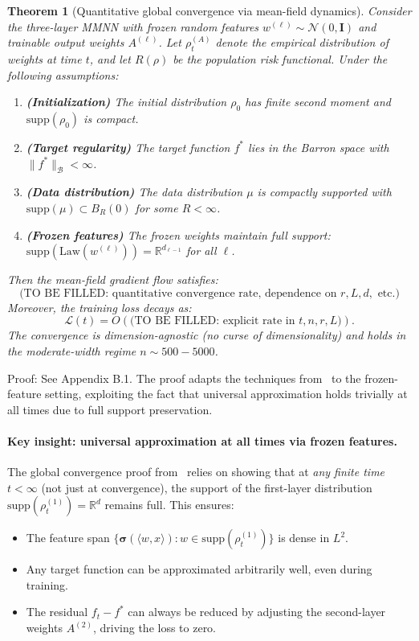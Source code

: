 \documentclass{article}
\DeclareRobustCommand{\ReLU}{\mathrel{\boldsymbol{\sigma}}}
\newtheorem{theorem}{Theorem}
\begin{document}
\begin{theorem}[Quantitative global convergence via mean-field dynamics]
\label{thm:quantitative_mf_convergence}
Consider the three-layer MMNN with frozen random features \( w^{(\ell)} \sim \mathcal{N}(0, \mathbf{I}) \) and trainable output weights \( A^{(\ell)} \). Let \( \rho_t^{(A)} \) denote the empirical distribution of weights at time \( t \), and let \( R(\rho) \) be the population risk functional. Under the following assumptions:
\begin{enumerate}
    \item \textbf{(Initialization)} The initial distribution \( \rho_0 \) has finite second moment and \( \text{supp}(\rho_0) \) is compact.
    \item \textbf{(Target regularity)} The target function \( f^* \) lies in the Barron space with \( \|f^*\|_{\mathcal{B}} < \infty \).
    \item \textbf{(Data distribution)} The data distribution \( \mu \) is compactly supported with \( \text{supp}(\mu) \subset B_R(0) \) for some \( R < \infty \).
    \item \textbf{(Frozen features)} The frozen weights maintain full support: \( \text{supp}(\text{Law}(w^{(\ell)})) = \mathbb{R}^{d_{\ell-1}} \) for all \( \ell \).
\end{enumerate}
Then the mean-field gradient flow satisfies:
\[
\text{(TO BE FILLED: quantitative convergence rate, dependence on } r, L, d, \text{ etc.)}
\]
Moreover, the training loss decays as:
\[
\mathcal{L}(t) = O\!\left(\text{(TO BE FILLED: explicit rate in } t, n, r, L\text{)}\right).
\]
The convergence is dimension-agnostic (no curse of dimensionality) and holds in the moderate-width regime \( n \sim 500{-}5000 \).
\end{theorem}

Proof: See Appendix B.1. The proof adapts the techniques from~\cite{globalconvergencesthreelayer} to the frozen-feature setting, exploiting the fact that universal approximation holds trivially at all times due to full support preservation.

\paragraph{Key insight: universal approximation at all times via frozen features.}
The global convergence proof from~\cite{nguyen2021proof} relies on showing that at \emph{any finite time} \( t < \infty \) (not just at convergence), the support of the first-layer distribution \( \text{supp}(\rho_t^{(1)}) = \mathbb{R}^d \) remains full. This ensures:
\begin{itemize}
    \item The feature span \( \{\ReLU(\langle w, x \rangle) : w \in \text{supp}(\rho_t^{(1)})\} \) is dense in \( L^2 \).
    \item Any target function can be approximated arbitrarily well, even during training.
    \item The residual \( f_t - f^* \) can always be reduced by adjusting the second-layer weights \( A^{(2)} \), driving the loss to zero.
\end{itemize}
\end{document}
